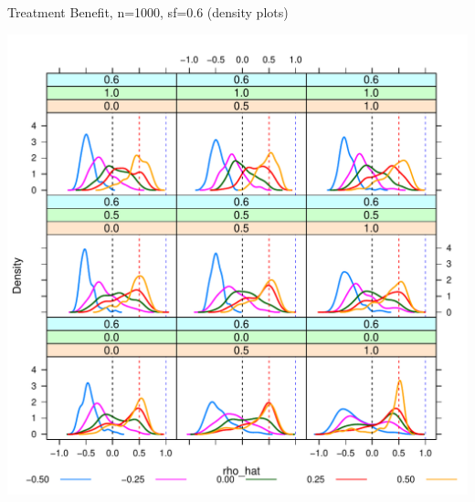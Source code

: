 \begin{frame}{Treatment Benefit, n=1000, sf=0.6 (density plots)}

\begin{center}
  \includegraphics[scale=0.45]{Figure3/tbl3DensityPlots_rho_n1000_003.pdf} %
\end{center}

\end{frame}

